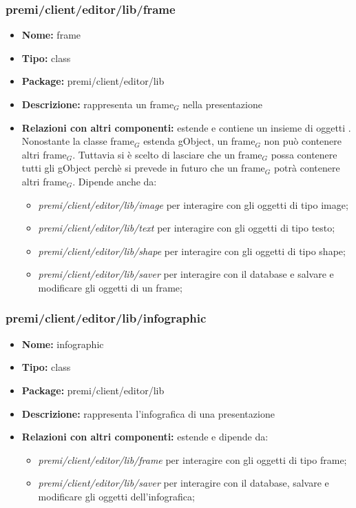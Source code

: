 \subsubsection{premi/client/editor/lib/frame}
\begin{itemize}
  \item[] \textbf{Nome:} frame
  \item[] \textbf{Tipo:} class
  \item[] \textbf{Package:} premi/client/editor/lib
  \item[] \textbf{Descrizione:} rappresenta un frame$_G$ nella presentazione
  \item[] \textbf{Relazioni con altri componenti:} estende  e contiene un insieme di oggetti . Nonostante la classe frame$_G$ estenda gObject, un frame$_G$ non può contenere altri frame$_G$. Tuttavia si è scelto di lasciare che un frame$_G$ possa contenere tutti gli gObject perchè si prevede in futuro che un frame$_G$ potrà contenere altri frame$_G$. Dipende anche da: 
\begin{itemize} 
	\item \textit{premi/client/editor/lib/image} per interagire con gli oggetti di tipo image;
	\item \textit{premi/client/editor/lib/text} per interagire con gli oggetti di tipo testo;
	\item \textit{premi/client/editor/lib/shape} per interagire con gli oggetti di tipo shape;
	\item \textit{premi/client/editor/lib/saver} per interagire con il database e salvare e modificare gli oggetti di un frame;
\end{itemize}  
\end{itemize}
\subsubsection{premi/client/editor/lib/infographic}
\begin{itemize}
  \item[] \textbf{Nome:} infographic
  \item[] \textbf{Tipo:} class
  \item[] \textbf{Package:} premi/client/editor/lib
  \item[] \textbf{Descrizione:} rappresenta l'infografica di una presentazione
  \item[] \textbf{Relazioni con altri componenti:} estende  e dipende da:
\begin{itemize} 
	\item \textit{premi/client/editor/lib/frame} per interagire con gli oggetti di tipo frame;
	\item \textit{premi/client/editor/lib/saver} per interagire con il database, salvare e modificare gli oggetti dell'infografica;
\end{itemize}  
\end{itemize}

